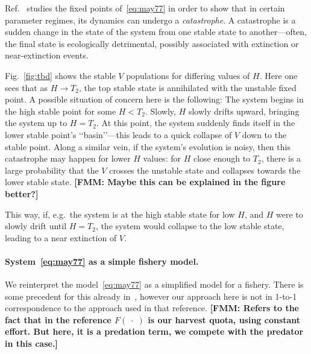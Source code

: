 \documentclass[smallextended]{svjour3}       %
\def\darg{\;\cdot\;}
\newcommand{\fm}[1]{{\color{Fabulous}\bf [FMM: #1]}}
\begin{document}
Ref.~\cite{may77} studies the fixed points of~\eqref{eq:may77} in order to show that in certain parameter regimes, its dynamics can undergo a \emph{catastrophe}.
A catastrophe is a sudden change in the state of the system from one stable state to another---often, the final state is ecologically detrimental, possibly associated with extinction or near-extinction events.

Fig.~\ref{fig:tbd} shows the stable $V$ populations for differing values of $H$. 
Here one sees that as $H\to T_2$, the top stable state is annihilated with the unstable fixed point.
A possible situation of concern here is the following:
The system begins in the high stable point for some $H<T_2$.
Slowly, $H$ slowly drifts upward, bringing the system up to $H=T_2$.
At this point, the system suddenly finds itself in the lower stable point's ‘‘basin’’---this leads to a quick collapse of $V$ down to the stable point.
Along a similar vein, if the system's evolution is noisy, then this catastrophe may happen for lower $H$ values: for $H$ close enough to $T_2$, there is a large probability that the $V$ crosses the unstable state and collapses towards the lower stable state.
\fm{Maybe this can be explained in the figure better?}

This way, if, e.g.\ the system is at the high stable state for low $H$, and $H$ were to slowly drift until $H=T_2$, the system would collapse to the low stable state, leading to a near extinction of $V$.

\hypertarget{paragraph-headings}{%
\paragraph{System~\eqref{eq:may77} as a simple fishery model.}\label{p:may as fishery}}
We reinterpret the model~\eqref{eq:may77} as a simplified model for a fishery.
There is some precedent for this already in~\cite{may77}, however our approach here is not in 1-to-1 correspondence to the approach used in that reference.
\fm{Refers to the fact that in the reference $F(\darg)$ is our harvest quota, using constant effort.
But here, it is a predation term, we compete with the predator in this case.}


\end{document}
